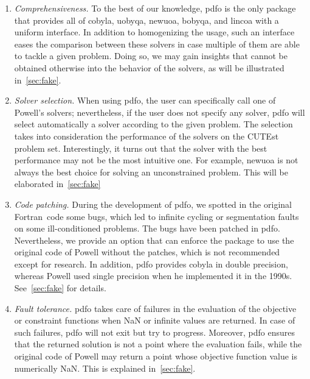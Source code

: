 \documentclass[11pt,draft]{article}
\numberwithin{equation}{section}
\def\cutest{\mbox{CUTEst}}
\def\fortran{\mbox{Fortran}}
\begin{document}
\begin{enumerate}
    \item \emph{Comprehensiveness.}
    To the best of our knowledge, \gls{pdfo} is the only package that provides all of \gls{cobyla}, \gls{uobyqa}, \gls{newuoa}, \gls{bobyqa}, and \gls{lincoa} with a uniform interface.
    In addition to homogenizing the usage, such an interface eases the comparison between these solvers in case multiple of them are able to tackle a given problem.
    Doing so, we may gain insights that cannot be obtained otherwise into the behavior of the solvers, as will be illustrated in~\cref{sec:fake}.

    \item \emph{Solver selection.}
    When using \gls{pdfo}, the user can specifically call one of Powell's solvers; nevertheless, if the user does not specify any solver, \gls{pdfo} will select automatically a solver according to the given problem.
    The selection takes into consideration the performance of the solvers on the \cutest~\cite{Gould_Orban_Toint_2015} problem set.
    Interestingly, it turns out that the solver with the best performance may not be the most intuitive one.
    For example, \gls{newuoa} is not always the best choice for solving an unconstrained problem.
    This will be elaborated in~\cref{sec:fake}

    \item \emph{Code patching.}
    During the development of \gls{pdfo}, we spotted in the original \fortran\ code some bugs, which led to infinite cycling or segmentation faults on some ill-conditioned problems.
    The bugs have been patched in \gls{pdfo}.
    Nevertheless, we provide an option that can enforce the package to use the original code of Powell without the patches, which is not recommended except for research.
    In addition, \gls{pdfo} provides \gls{cobyla} in double precision, whereas Powell used single precision when he implemented it in the 1990s. See~\cref{sec:fake} for details.

    \item \emph{Fault tolerance.}
    \gls{pdfo} takes care of failures in the evaluation of the objective or constraint functions when NaN or infinite values are returned.
    In case of such failures, \gls{pdfo} will not exit but try to progress.
    Moreover, \gls{pdfo} ensures that the returned solution is not a point where the evaluation fails, while the original code of Powell may return a point whose objective function value is numerically NaN. This is explained in~\cref{sec:fake}.


\end{enumerate}
\end{document}
